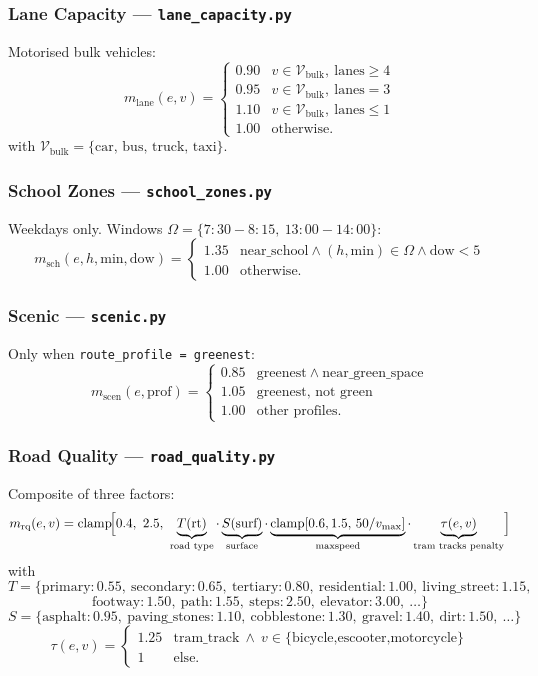 \documentclass[12pt,a4paper]{article}
\begin{document}
\subsubsection{Lane Capacity — \texttt{lane\_capacity.py}} Motorised bulk vehicles:
\[
m_{\text{lane}}(e,v) =
\begin{cases}
0.90 & v\in\mathcal{V}_{\text{bulk}},\ \text{lanes}\ge 4 \\
0.95 & v\in\mathcal{V}_{\text{bulk}},\ \text{lanes}=3 \\
1.10 & v\in\mathcal{V}_{\text{bulk}},\ \text{lanes}\le 1 \\
1.00 & \text{otherwise.}
\end{cases}
\]
with $\mathcal{V}_{\text{bulk}} = \{\text{car, bus, truck, taxi}\}$.

\subsubsection{School Zones — \texttt{school\_zones.py}} Weekdays only. Windows $\Omega = \{7{:}30{-}8{:}15,\ 13{:}00{-}14{:}00\}$:
\[
m_{\text{sch}}(e,h,\text{min},\text{dow}) = \begin{cases} 1.35 & \text{near\_school}\land(h,\text{min})\in\Omega\land\text{dow}<5 \\ 1.00 & \text{otherwise.} \end{cases}
\]

\subsubsection{Scenic — \texttt{scenic.py}} Only when \texttt{route\_profile = greenest}:
\[
m_{\text{scen}}(e,\text{prof}) = \begin{cases} 0.85 & \text{greenest}\ \land\ \text{near\_green\_space} \\ 1.05 & \text{greenest, not green} \\ 1.00 & \text{other profiles.} \end{cases}
\]

\subsubsection{Road Quality — \texttt{road\_quality.py}} Composite of three factors:
\[
m_{\text{rq}}(e,v) = \mathrm{clamp}\!\Bigl[0.4,\ 2.5,\ \underbrace{T(\text{rt})}_{\text{road type}}\cdot \underbrace{S(\text{surf})}_{\text{surface}}\cdot \underbrace{\mathrm{clamp}[0.6,1.5,\,50/v_{\max}]}_{\text{maxspeed}}\cdot \underbrace{\tau(e,v)}_{\text{tram tracks penalty}}\Bigr]
\]
with
\[
T = \{\text{primary}:0.55,\ \text{secondary}:0.65,\ \text{tertiary}:0.80,\ \text{residential}:1.00,\ \text{living\_street}:1.15,
\]
\[
\text{footway}:1.50,\ \text{path}:1.55,\ \text{steps}:2.50,\ \text{elevator}:3.00,\ \ldots\}
\]
\[
S = \{\text{asphalt}:0.95,\ \text{paving\_stones}:1.10,\ \text{cobblestone}:1.30,\ \text{gravel}:1.40,\ \text{dirt}:1.50,\ \ldots\}
\]
\[
\tau(e,v) = \begin{cases} 1.25 & \text{tram\_track}\ \land\ v\in\{\text{bicycle,escooter,motorcycle}\} \\ 1 & \text{else.}\end{cases}
\]
\end{document}
